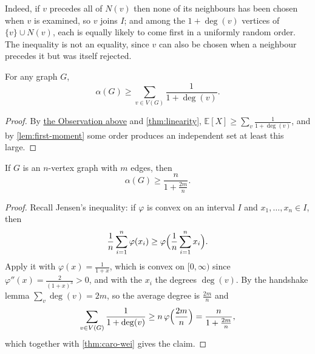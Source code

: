 Indeed, if \(v\) precedes all of \(N(v)\) then none of its neighbours has been chosen when \(v\) is examined, so \(v\) joins \(I\); and among the \(1 + \deg(v)\) vertices of \(\{v\} \cup N(v)\), each is equally likely to come first in a uniformly random order. The inequality is not an equality, since \(v\) can also be chosen when a neighbour precedes it but was itself rejected.
\begin{center}
\end{center}

\begin{theorem}\label{thm:caro-wei}
    For any graph \(G\),
    \[
        \alpha(G) \ge \sum_{v \in V(G)} \frac{1}{1 + \deg(v)}.
    \]
\end{theorem}

\begin{proof}
    By \hyperref[obs:caro-wei-prob]{the Observation above} and \autoref{thm:linearity}, \(\mathbb{E}[X] \ge \sum_{v} \frac{1}{1+\deg(v)}\), and by \autoref{lem:first-moment} some order produces an independent set at least this large.
\end{proof}

\begin{corollary}\label{cor:caro-wei}
    If \(G\) is an \(n\)-vertex graph with \(m\) edges, then
    \[
        \alpha(G) \ge \frac{n}{1 + \frac{2m}{n}}.
    \]
\end{corollary}

\begin{proof}
    Recall Jensen's inequality: if \(\varphi\) is convex on an interval \(I\) and \(x_1, \ldots, x_n \in I\), then
    \[
        \frac{1}{n} \sum_{i=1}^{n} \varphi(x_i) \ge \varphi\Bigl( \frac{1}{n} \sum_{i=1}^{n} x_i \Bigr).
    \]
    Apply it with \(\varphi(x) = \frac{1}{1+x}\), which is convex on \([0,\infty)\) since \(\varphi''(x) = \frac{2}{(1+x)^3} > 0\), and with the \(x_i\) the degrees \(\deg(v)\). By the handshake lemma \(\sum_{v} \deg(v) = 2m\), so the average degree is \(\frac{2m}{n}\) and
    \[
        \sum_{v \in V(G)} \frac{1}{1 + \deg(v)} \ge n \, \varphi\Bigl( \frac{2m}{n} \Bigr) = \frac{n}{1 + \frac{2m}{n}},
    \]
    which together with \autoref{thm:caro-wei} gives the claim.
\end{proof}

